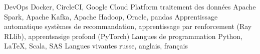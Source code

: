 \begin{cvskills}
  \cvskill
    {DevOps}
    {Docker, CircleCI, Google Cloud Platform}
  \cvskill
    {traitement des données}
    {Apache Spark, Apache Kafka, Apache Hadoop, Oracle, pandas}
  \cvskill
    {Apprentissage automatique}
    {systèmes de recommandation, apprentissage par renforcement (Ray RLlib), apprentsasige profond (PyTorch)}
  \cvskill
    {Langues de programmation}
    {Python, LaTeX, Scala, SAS}
  \cvskill
    {Langues vivantes}
    {russe, anglais, français}
\end{cvskills}
